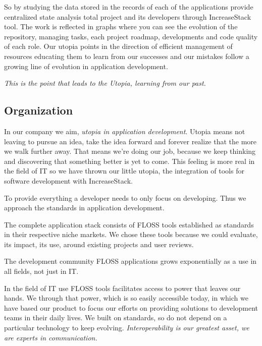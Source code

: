 \documentclass[11pt]{scrartcl}
\begin{document}
\par So by studying the data stored in the records of each of the applications provide centralized state analysis total project and its developers through IncreaseStack tool. The work is reflected in graphs where you can see the evolution of the repository, managing tasks, each project roadmap, developments and code quality of each role. Our utopia points in the direction of efficient management of resources educating them to learn from our successes and our mistakes follow a growing line of evolution in application development.

\par \emph{This is the point that leads to the Utopia, learning from our past.}

\subsection{Organization}

\par In our company we aim, \emph{utopia in application development}. Utopia means not leaving to pursue an idea, take the idea forward and forever realize that the more we walk further away. That means we're doing our job, because we keep thinking and discovering that something better is yet to come. This feeling is more real in the field of IT so we have thrown our little utopia, the integration of tools for software development with IncreaseStack.

\par To provide everything a developer needs to only focus on developing. Thus we approach the standards in application development.

\par The complete application stack consists of FLOSS tools established as standards in their respective niche markets. We chose these tools because we could evaluate, its impact, its use, around existing projects and user reviews.

\par The development community FLOSS applications grows exponentially as a use in all fields, not just in IT.

\par In the field of IT use FLOSS tools facilitates access to power that leaves our hands. We through that power, which is so easily accessible today, in which we have based our product to focus our efforts on providing solutions to development teams in their daily lives. We built on standards, so do not depend on a particular technology to keep evolving. \emph{Interoperability is our greatest asset, we are experts in communication.}
\end{document}
